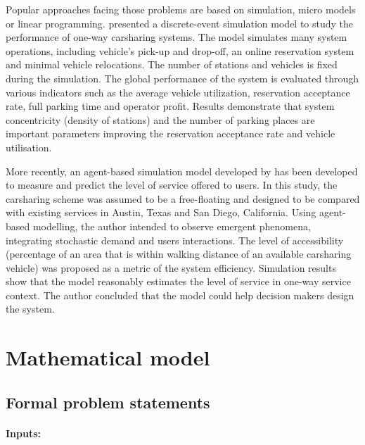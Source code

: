 \begin{bibunit}[ieeetr]
\medskip
Popular approaches facing those problems are based on simulation, micro models or linear programming.
\cite{li_design_2011} presented a discrete-event simulation model to study the performance of one-way carsharing systems.
The model simulates many system operations, including vehicle's pick-up and drop-off, an online reservation system and minimal vehicle relocations.
The number of stations and vehicles is fixed during the simulation.
The global performance of the system is evaluated through various indicators such as the average vehicle utilization, reservation acceptance rate, full parking time and operator profit.
Results demonstrate that system concentricity (density of stations) and the number of parking places are important parameters improving the reservation acceptance rate and vehicle utilisation.





\medskip
More recently, an agent-based simulation model developed by \cite{barrios_performance_2012} has been developed to measure and predict the level of service offered to users.
In this study, the carsharing scheme was assumed to be a free-floating and designed to be compared with existing services in Austin, Texas and San Diego, California.
Using agent-based modelling, the author intended to observe emergent phenomena, integrating stochastic demand and users interactions.
The level of accessibility (percentage of an area that is within walking distance of an available carsharing vehicle) was proposed as a metric of the system efficiency.
Simulation results show that the model reasonably estimates the level of service in one-way service context.
The author concluded that the model could help decision makers design the system.










\newpage
\section{Mathematical model} \label{sec:mathModel}
\subsection{Formal problem statements}
\paragraph{Inputs:}


\end{bibunit}
